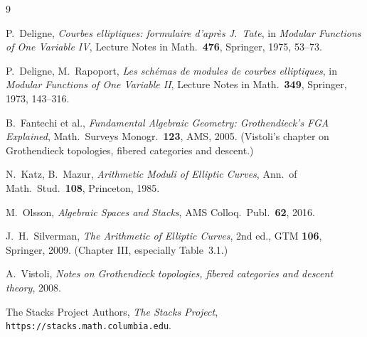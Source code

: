 \documentclass[11pt]{article}
\theoremstyle{definition}
\theoremstyle{plain}
\theoremstyle{remark}
\begin{document}
\begin{thebibliography}{9}

P.~Deligne, \emph{Courbes elliptiques: formulaire d'après J.~Tate}, in
\emph{Modular Functions of One Variable IV}, Lecture Notes in Math.\ \textbf{476},
Springer, 1975, 53--73.

P.~Deligne, M.~Rapoport, \emph{Les schémas de modules de courbes elliptiques}, in
\emph{Modular Functions of One Variable II}, Lecture Notes in Math.\ \textbf{349},
Springer, 1973, 143--316.

B.~Fantechi et al., \emph{Fundamental Algebraic Geometry: Grothendieck's FGA
Explained}, Math.\ Surveys Monogr.\ \textbf{123}, AMS, 2005.  (Vistoli's chapter
on Grothendieck topologies, fibered categories and descent.)

N.~Katz, B.~Mazur, \emph{Arithmetic Moduli of Elliptic Curves}, Ann.\ of Math.\
Stud.\ \textbf{108}, Princeton, 1985.

M.~Olsson, \emph{Algebraic Spaces and Stacks}, AMS Colloq.\ Publ.\ \textbf{62},
2016.

J.~H.~Silverman, \emph{The Arithmetic of Elliptic Curves}, 2nd ed., GTM
\textbf{106}, Springer, 2009.  (Chapter III, especially Table~3.1.)

A.~Vistoli, \emph{Notes on Grothendieck topologies, fibered categories and descent
theory}, 2008.

The Stacks Project Authors, \emph{The Stacks Project},
\texttt{https://stacks.math.columbia.edu}.

\end{thebibliography}
\end{document}
